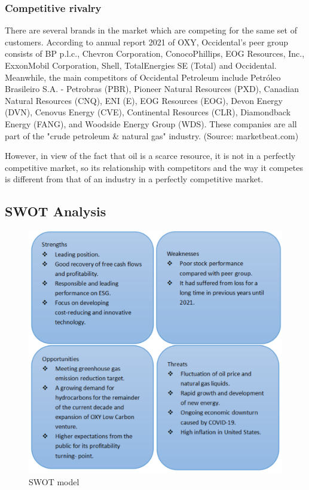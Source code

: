 \documentclass[
	a4paper, %
	12pt,%
]{CSSullivanBusinessReport}
\begin{document}
\begin{fullwidth}
\subsubsection{Competitive rivalry}
There are several brands in the market which are competing for the same set of customers. According to annual report 2021 of OXY, Occidental’s peer group consists of BP p.l.c., Chevron Corporation, ConocoPhillips, EOG Resources, Inc., ExxonMobil Corporation, Shell, TotalEnergies SE (Total) and Occidental.
Meanwhile, the main competitors of Occidental Petroleum include Petróleo Brasileiro S.A. - Petrobras (PBR), Pioneer Natural Resources (PXD), Canadian Natural Resources (CNQ), ENI (E), EOG Resources (EOG), Devon Energy (DVN), Cenovus Energy (CVE), Continental Resources (CLR), Diamondback Energy (FANG), and Woodside Energy Group (WDS). These companies are all part of the "crude petroleum & natural gas" industry. (Source: marketbeat.com)\par
However, in view of the fact that oil is a scarce resource, it is not in a perfectly competitive market, so its relationship with competitors and the way it competes is different from that of an industry in a perfectly competitive market.
\subsection{SWOT Analysis}
\begin{figure}[h]
    \centering
    \includegraphics[width=13cm]{Images/SWOT.png}
    \caption{SWOT model}
    \label{SWOT}
\end{figure}

\end{fullwidth}
\end{document}

